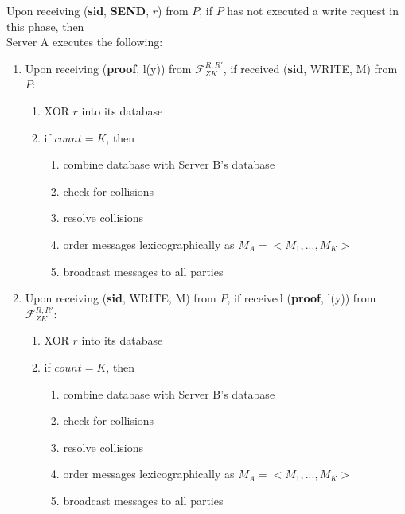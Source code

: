 \begin{tcolorbox}[colback=white, arc=5pt]
\extitem Upon receiving (\textbf{sid}, \textbf{SEND}, $r$) from $P$, if $P$ has not executed a write request in this phase, then \\
    Server A executes the following:
    \begin{enumerate}
        \item Upon receiving (\textbf{proof}, l(y)) from $\mathcal{F}_{ZK}^{R,R'}$, if received (\textbf{sid}, WRITE, M) from $P$:
        \begin{enumerate}
            \item XOR $r$ into its database
            \item if $count=K$, then
            \begin{enumerate}
                \item combine database with Server B's database
                \item check for collisions
                \item resolve collisions
                \item order messages lexicographically as $M_A=<M_1,...,M_K>$
                \item broadcast messages to all parties
            \end{enumerate}
        \end{enumerate}
        \item Upon receiving (\textbf{sid}, WRITE, M) from $P$, if received (\textbf{proof}, l(y)) from $\mathcal{F}_{ZK}^{R,R'}$:
        \begin{enumerate}
            \item XOR $r$ into its database
            \item if $count=K$, then
            \begin{enumerate}
                \item combine database with Server B's database
                \item check for collisions
                \item resolve collisions
                \item order messages lexicographically as $M_A=<M_1,...,M_K>$
                \item broadcast messages to all parties
            \end{enumerate}
        \end{enumerate}
    \end{enumerate}
\end{tcolorbox}

\label{fig:riposte_protocol}
